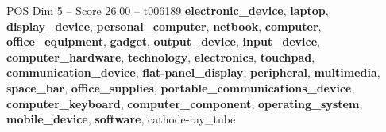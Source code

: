\begin{textsample}{POS Dim 5 – Score 26.00 – t006189}  \label{ex:f5_pos_039}
\textbf{electronic\_device}, \textbf{laptop}, \textbf{display\_device}, \textbf{personal\_computer}, \textbf{netbook}, \textbf{computer}, \textbf{office\_equipment}, \textbf{gadget}, \textbf{output\_device}, \textbf{input\_device}, \textbf{computer\_hardware}, \textbf{technology}, \textbf{electronics}, \textbf{touchpad}, \textbf{communication\_device}, \textbf{flat-panel\_display}, \textbf{peripheral}, \textbf{multimedia}, \textbf{space\_bar}, \textbf{office\_supplies}, \textbf{portable\_communications\_device}, \textbf{computer\_keyboard}, \textbf{computer\_component}, \textbf{operating\_system}, \textbf{mobile\_device}, \textbf{software}, cathode-ray\_tube

\end{textsample}
